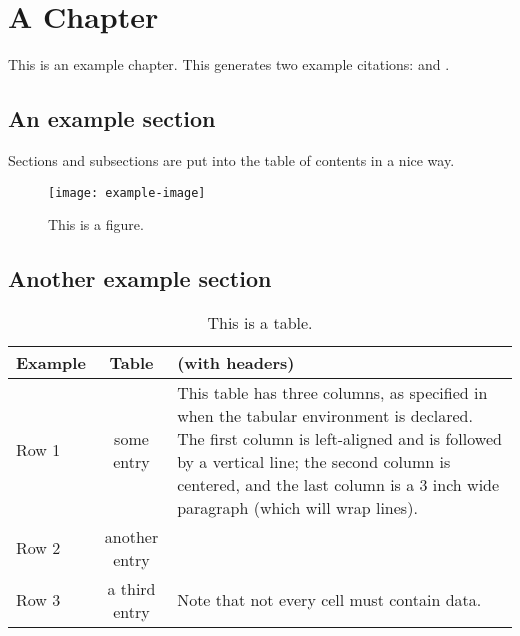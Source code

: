 \chapter{A Chapter}


This is an example chapter.  This generates two example citations: \cite{book1} and \cite{article1}.

\section{An example section}

Sections and subsections are put into the table of contents in a nice way.

\begin{figure}
	\begin{center}
		\texttt{[image: example-image]}
		\caption{This is a figure.}
	\end{center}
\end{figure}

\section{Another example section}

\begin{table}
	\begin{center}
		\begin{tabular}{l|cp{3in}}
			\textbf{Example} & \textbf{Table} & \textbf{(with headers)}\\\hline
			Row 1 & some entry & This table has three columns, as specified in when the tabular environment is declared.  The first column is left-aligned and is followed by a vertical line; the second column is centered, and the last column is a 3 inch wide paragraph (which will wrap lines). \\
			Row 2 & another entry & \\
			Row 3 & a third entry & Note that not every cell must contain data.
		\end{tabular}
		\caption{This is a table.}
	\end{center}
\end{table}

